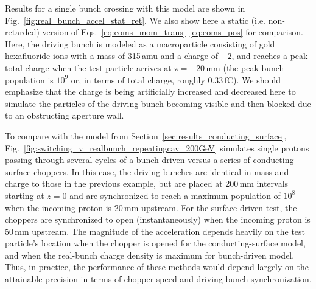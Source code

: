 \documentclass[reprint,
               amsmath,amssymb,nofootinbib, aps%
              ]{revtex4-2}
\begin{document}
Results for a single bunch crossing with this model are shown in Fig.~\ref{fig:real_bunch_accel_stat_ret}. We also show here a static (i.e. non-retarded) version of Eqs.~\ref{eq:eoms_mom_trans}--\ref{eq:eoms_pos} for comparison. 
Here, the driving bunch is modeled as a macroparticle consisting of gold hexafluoride ions with a mass of 315\,amu and a charge of $-2$, and reaches a peak total charge when the test particle arrives at $\textrm{z}=-20$\,mm (the peak bunch population is $10^9$ or, in terms of total charge, roughly 0.33\,fC). We should emphasize that the charge is being artificially increased and decreased here to simulate the particles of the driving bunch becoming visible and then blocked due to an obstructing aperture wall. 

To compare with the model from Section~\ref{sec:results_conducting_surface}, Fig.~\ref{fig:switching_v_realbunch_repeatingcav_200GeV} simulates single protons passing through several cycles of a bunch-driven versus a series of conducting-surface choppers. In this case, the driving bunches are identical in mass and charge to those in the previous example, but are placed at 200\,mm intervals starting at $z=0$ and are synchronized to reach a maximum population of $10^8$ when the incoming proton is 20\,mm upstream. For the surface-driven test, the choppers are synchronized to open (instantaneously) when the incoming proton is 50\,mm upstream. The magnitude of the acceleration depends heavily on the test particle's location when the chopper is opened for the conducting-surface model, and when the real-bunch charge density is maximum for bunch-driven model. Thus, in practice, the performance of these methods would depend largely on the attainable precision in terms of chopper speed and driving-bunch synchronization. 
\end{document}
